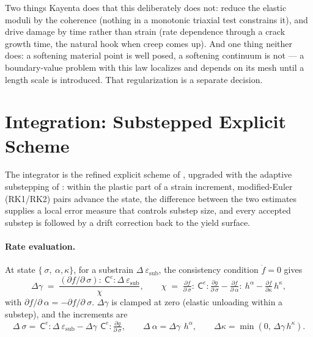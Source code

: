 \documentclass[12pt]{article}
\newcommand{\stress}{~\sigma}
\newcommand{\backstress}{~\alpha}
\newcommand{\strainincr}{\Delta~\varepsilon}
\newcommand{\Celast}{{~{\mathsf C}^e}}
\newcommand{\halpha}{~h^{\alpha}}
\begin{document}
Two things Kayenta does that this deliberately does not: reduce the
elastic moduli by the coherence (nothing in a monotonic triaxial test
constrains it), and drive damage by time rather than strain (rate
dependence through a crack growth time, the natural hook when creep
comes up). And one thing neither does: a softening material point is
well posed, a softening continuum is not --- a boundary-value problem
with this law localizes and depends on its mesh until a length scale
is introduced. That regularization is a separate decision.

\section{Integration: Substepped Explicit Scheme}
\label{sec:integration}

The integrator is the refined explicit scheme of
\citet[Algorithms~1--2]{Sun.Chen.Ostien:2014}, upgraded with the
adaptive substepping of \citet{Sloan.Abbo.Sheng:2001}: within the
plastic part of a strain increment, modified-Euler (RK1/RK2) pairs
advance the state, the difference between the two estimates supplies
a local error measure that controls substep size, and every accepted
substep is followed by a drift correction back to the yield surface.

\paragraph{Rate evaluation.}
At state $\{\stress, \backstress, \kappa\}$, for a substrain
$\strainincr_{\mathrm{sub}}$, the consistency condition
$\dot f = 0$ gives
\begin{equation}
  \Delta\gamma \;=\;
  \frac{(\partial f/\partial \stress) : \Celast :
        \strainincr_{\mathrm{sub}}}{\chi},
  \qquad
  \chi \;=\; \tfrac{\partial f}{\partial \stress}
            :\Celast:\tfrac{\partial g}{\partial \stress}
          - \tfrac{\partial f}{\partial \backstress}:\halpha
          - \tfrac{\partial f}{\partial \kappa}\,h^{\kappa},
  \label{eq:dgamma}
\end{equation}
with $\partial f/\partial\backstress = -\partial f/\partial\stress$.
$\Delta\gamma$ is clamped at zero (elastic unloading within a
substep), and the increments are
\begin{equation}
  \Delta\stress = \Celast : \strainincr_{\mathrm{sub}}
                - \Delta\gamma\,\Celast : \tfrac{\partial g}{\partial\stress},
  \qquad
  \Delta\backstress = \Delta\gamma\,\halpha,
  \qquad
  \Delta\kappa = \min(0,\,\Delta\gamma\,h^{\kappa}).
  \label{eq:rates}
\end{equation}
\end{document}
